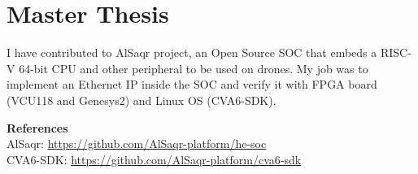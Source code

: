 \section{Master Thesis}

I have contributed to AlSaqr project, an Open Source SOC that embeds a RISC-V
64-bit CPU and other peripheral to be used on drones. My job was to implement
an Ethernet IP inside the SOC and verify it with FPGA board (VCU118 and
Genesys2) and Linux OS (CVA6-SDK). 

\vspace{2mm}
\textbf{References} \\
AlSaqr: \url{https://github.com/AlSaqr-platform/he-soc} \\
CVA6-SDK: \url{https://github.com/AlSaqr-platform/cva6-sdk}
